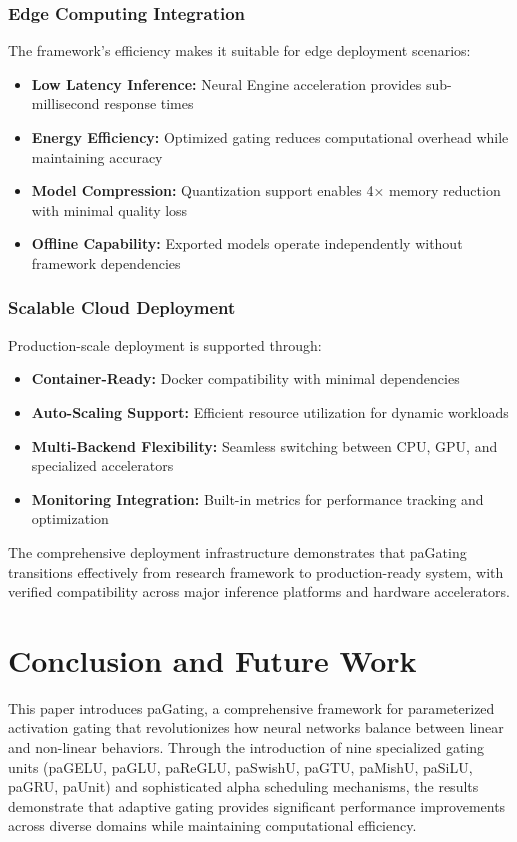 \documentclass[lettersize,journal]{IEEEtran}
\begin{document}
\subsubsection{Edge Computing Integration}
The framework's efficiency makes it suitable for edge deployment scenarios:
\begin{itemize}
\item \textbf{Low Latency Inference:} Neural Engine acceleration provides sub-millisecond response times
\item \textbf{Energy Efficiency:} Optimized gating reduces computational overhead while maintaining accuracy
\item \textbf{Model Compression:} Quantization support enables 4× memory reduction with minimal quality loss
\item \textbf{Offline Capability:} Exported models operate independently without framework dependencies
\end{itemize}

\subsubsection{Scalable Cloud Deployment}
Production-scale deployment is supported through:
\begin{itemize}
\item \textbf{Container-Ready:} Docker compatibility with minimal dependencies
\item \textbf{Auto-Scaling Support:} Efficient resource utilization for dynamic workloads
\item \textbf{Multi-Backend Flexibility:} Seamless switching between CPU, GPU, and specialized accelerators
\item \textbf{Monitoring Integration:} Built-in metrics for performance tracking and optimization
\end{itemize}

The comprehensive deployment infrastructure demonstrates that paGating transitions effectively from research framework to production-ready system, with verified compatibility across major inference platforms and hardware accelerators.

\section{Conclusion and Future Work}

This paper introduces paGating, a comprehensive framework for parameterized activation gating that revolutionizes how neural networks balance between linear and non-linear behaviors. Through the introduction of nine specialized gating units (paGELU, paGLU, paReGLU, paSwishU, paGTU, paMishU, paSiLU, paGRU, paUnit) and sophisticated alpha scheduling mechanisms, the results demonstrate that adaptive gating provides significant performance improvements across diverse domains while maintaining computational efficiency.
\end{document}
